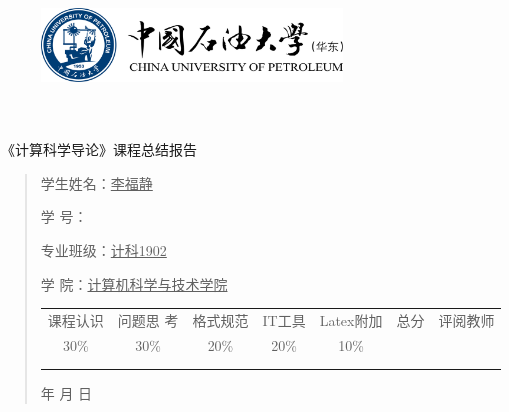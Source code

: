 \documentclass{article}
\renewcommand{\today}{\number\year 年 \number\month 月 \number\day 日}
\begin{document}
\begin{figure}
    \centering
    \includegraphics[width=8cm]{upc.png}

    \label{figupc}
\end{figure}

	\begin{center}
		\quad \\
		\quad \\
		\heiti \fontsize{45}{17} \quad \quad \quad 
		\vskip 1.5cm
		\heiti {} 《计算科学导论》课程总结报告
	\end{center}
	\vskip 2.0cm
		
	\begin{quotation}
		\doublespacing
		
        \par\setlength\parindent{7em}
		\quad 

		学生姓名：\underline{\qquad  李福静 \qquad \qquad}

		学\hspace{0.61cm} 号：\underline{\qquad}
		
		专业班级：\underline{\qquad 计科1902 \qquad  }
		
        学\hspace{0.61cm} 院：\underline{计算机科学与技术学院}
		\vskip 2cm
		\centering
		\begin{table}[h]
            \centering 
            \begin{tabular}{|c|c|c|c|c|c|c|}
                \hline
                课程认识 & 问题思 考 & 格式规范  & IT工具  & Latex附加  & 总分 & 评阅教师 \\
                30\% & 30\% & 20\% & 20\% & 10\% &  &  \\
                \hline
                 & & & & & &\\
                & & & & & &\\
                \hline
            \end{tabular}
        \end{table}
		\vskip 2cm
		\today
	\end{quotation}
\end{document}
